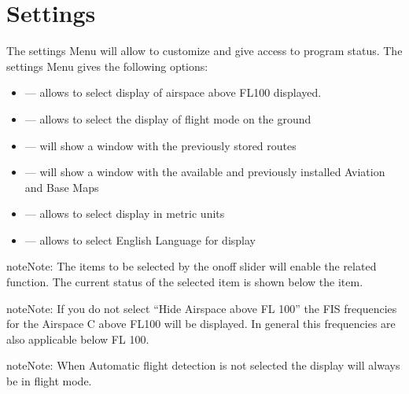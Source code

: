 \documentclass[letterpaper,10pt,english]{sphinxmanual}
\begin{document}
\section{Settings}
\label{\detokenize{01-intro/further_steps:settings}}
\sphinxAtStartPar
The settings Menu will allow to customize  and give
access to program status.  The settings Menu gives the following options:
\begin{itemize}
\item {} 
\sphinxAtStartPar
{} — allows to select display of airspace above FL100 displayed.

\item {} 
\sphinxAtStartPar
{} — allows to select the display of flight mode on the ground

\item {} 
\sphinxAtStartPar
{} — will show a window with the previously stored routes

\item {} 
\sphinxAtStartPar
{} — will show a window with the available and previously installed Aviation and Base Maps

\item {} 
\sphinxAtStartPar
{} — allows to select display in metric units

\item {} 
\sphinxAtStartPar
{} — allows to select English Language for display

\end{itemize}

\begin{sphinxadmonition}{note}{Note:}
\sphinxAtStartPar
The items to be selected by the on\sphinxhyphen{}off slider will enable the related function. The current status of the selected item is shown below the item.
\end{sphinxadmonition}

\begin{sphinxadmonition}{note}{Note:}
\sphinxAtStartPar
If you do not select “Hide Airspace above FL 100” the FIS frequencies for the Airspace C above FL100 will be displayed. In general this frequencies are also applicable below FL 100.
\end{sphinxadmonition}

\begin{sphinxadmonition}{note}{Note:}
\sphinxAtStartPar
When Automatic flight detection is not selected the display will always be in flight mode.
\end{sphinxadmonition}
\end{document}
